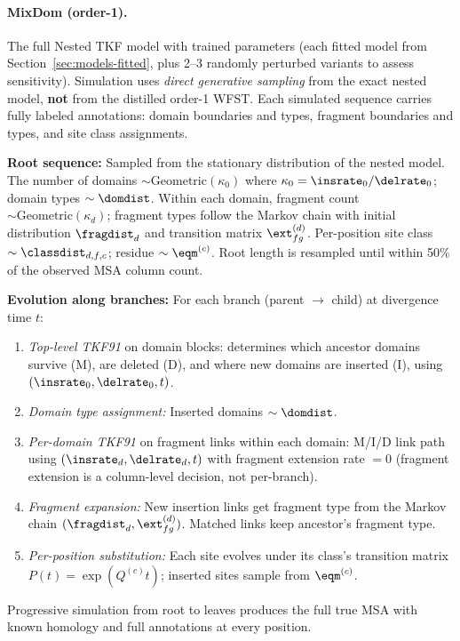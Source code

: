 \paragraph{MixDom (order-1).}
The full Nested TKF model with trained parameters
(each fitted model from Section~\ref{sec:models-fitted},
plus 2--3 randomly perturbed variants to assess sensitivity).
Simulation uses \emph{direct generative sampling} from the exact
nested model, \textbf{not} from the distilled order-1 WFST.
Each simulated sequence carries fully labeled annotations:
domain boundaries and types, fragment boundaries and types,
and site class assignments.

\textbf{Root sequence:} Sampled from the stationary distribution of
the nested model.  The number of domains $\sim \text{Geometric}(\kappa_0)$
where $\kappa_0 = \insrate_0/\delrate_0$; domain types $\sim \domdist$.
Within each domain, fragment count $\sim \text{Geometric}(\kappa_d)$;
fragment types follow the Markov chain with initial distribution
$\fragdist_d$ and transition matrix $\ext^{(d)}_{fg}$.
Per-position site class $\sim \classdist_{d,f,c}$; residue $\sim \eqm^{(c)}$.
Root length is resampled until within 50\% of the observed MSA column count.

\textbf{Evolution along branches:} For each branch (parent $\to$ child)
at divergence time $t$:
\begin{enumerate}
\item \emph{Top-level TKF91} on domain blocks:
  determines which ancestor domains survive (M), are deleted (D),
  and where new domains are inserted (I), using $(\insrate_0, \delrate_0, t)$.
\item \emph{Domain type assignment:} Inserted domains $\sim \domdist$.
\item \emph{Per-domain TKF91} on fragment links within each domain:
  M/I/D link path using $(\insrate_d, \delrate_d, t)$ with fragment
  extension rate $=0$ (fragment extension is a column-level decision,
  not per-branch).
\item \emph{Fragment expansion:} New insertion links get fragment type
  from the Markov chain $(\fragdist_d, \ext^{(d)}_{fg})$.
  Matched links keep ancestor's fragment type.
\item \emph{Per-position substitution:} Each site evolves under its
  class's transition matrix $P(t) = \exp(Q^{(c)} t)$;
  inserted sites sample from $\eqm^{(c)}$.
\end{enumerate}
Progressive simulation from root to leaves produces the full true MSA
with known homology and full annotations at every position.

